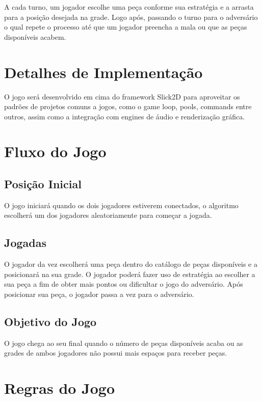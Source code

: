 \documentclass[
	12pt,	
	openany,			
	oneside,			
	a4paper,			
	english,			
	french,			
	spanish,			
	brazil,	
	]{abntex2}
\begin{document}
A cada turno, um jogador escolhe uma peça conforme sua estratégia e a arrasta para a posição desejada na grade. Logo após, passando o turno para o adversário o qual repete o processo até que um jogador preencha a mala ou que as peças disponíveis acabem.
 
\section{Detalhes de Implementação}

O jogo será desenvolvido em cima do framework Slick2D para aproveitar os padrões de projetos comuns a jogos, como o game loop, pools, commands entre outros, assim como a integração com engines de áudio e renderização gráfica.

\section{Fluxo do Jogo}

\subsection{Posição Inicial}

O jogo iniciará quando os dois jogadores estiverem conectados, o algoritmo escolherá um dos jogadores aleatoriamente para começar a jogada. 

\subsection{Jogadas}

O jogador da vez escolherá uma peça dentro do catálogo de peças disponíveis e a posicionará na sua grade. O jogador poderá fazer uso de estratégia  ao escolher a sua peça a fim de obter mais pontos ou dificultar o jogo do adversário. Após posicionar sua peça, o jogador passa a vez para o adversário.

\subsection{Objetivo do Jogo}

O jogo chega ao seu final quando o número de peças disponíveis acaba ou as grades de ambos jogadores não possui mais espaços para receber peças.

\section{Regras do Jogo}
\end{document}
